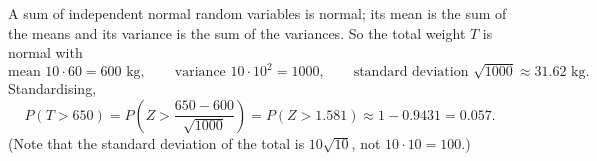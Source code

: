 A sum of independent normal random variables is normal; its mean is the sum of the means and its variance is the sum of the variances. So the total weight $T$ is normal with
\[\text{mean }10\cdot60=600\text{ kg},\qquad\text{variance }10\cdot10^2=1000,\qquad\text{standard deviation }\sqrt{1000}\approx31.62\text{ kg}.\]
Standardising,
\[P(T>650)=P\left(Z>\dfrac{650-600}{\sqrt{1000}}\right)=P(Z>1.581)\approx1-0.9431=\boxed{0.057}.\]
(Note that the standard deviation of the total is $10\sqrt{10}$, not $10\cdot10=100$.)
